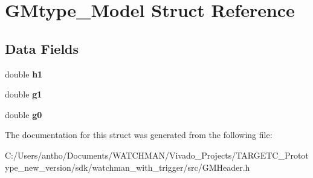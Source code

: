 \section{G\+Mtype\+\_\+\+Model Struct Reference}
\label{struct_g_mtype___model}
\subsection*{Data Fields}
\begin{DoxyCompactItemize}
\item 
\mbox{\label{struct_g_mtype___model_a74553021dc63dd47aa8b838f9312c599}} 
double {\bfseries h1}
\item 
\mbox{\label{struct_g_mtype___model_adf05fcfd83be702fb6d79e601cd7df76}} 
double {\bfseries g1}
\item 
\mbox{\label{struct_g_mtype___model_a4247e3e863cf569494a289df72e4178c}} 
double {\bfseries g0}
\end{DoxyCompactItemize}


The documentation for this struct was generated from the following file\+:\begin{DoxyCompactItemize}
\item 
C\+:/\+Users/antho/\+Documents/\+W\+A\+T\+C\+H\+M\+A\+N/\+Vivado\+\_\+\+Projects/\+T\+A\+R\+G\+E\+T\+C\+\_\+\+Prototype\+\_\+new\+\_\+version/sdk/watchman\+\_\+with\+\_\+trigger/src/G\+M\+Header.\+h\end{DoxyCompactItemize}
